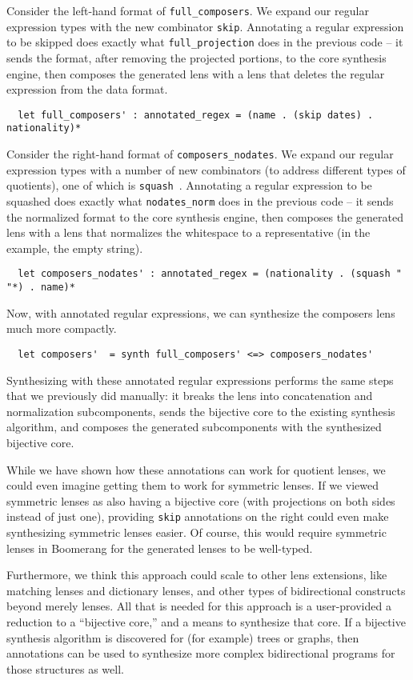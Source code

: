 \documentclass[a4paper]{article}
\begin{document}
Consider the left-hand format of \lstinline{full_composers}. We expand our
regular expression types with the new combinator \lstinline{skip}. Annotating a
regular expression to be skipped does exactly what \lstinline{full_projection}
does in the previous code -- it sends the format, after removing the projected
portions, to the core synthesis engine, then composes the generated lens with a
lens that deletes the regular expression from the data format.
%
\begin{lstlisting}
  let full_composers' : annotated_regex = (name . (skip dates) . nationality)*
\end{lstlisting}
%

Consider the right-hand format of \lstinline{composers_nodates}. We expand our
regular expression types with a number of new combinators (to address different
types of quotients), one of which is
\lstinline{squash}~\cite{maina+:quotient-synthesis}. Annotating a regular
expression to be squashed does exactly what \lstinline{nodates_norm} does in the
previous code -- it sends the normalized format to the core synthesis engine,
then composes the generated lens with a lens that normalizes the whitespace to a
representative (in the example, the empty string).
%
\begin{lstlisting}
  let composers_nodates' : annotated_regex = (nationality . (squash " "*) . name)*
\end{lstlisting}
%

Now, with annotated regular expressions, we can synthesize the composers lens much
more compactly.
%
\begin{lstlisting}
  let composers'  = synth full_composers' <=> composers_nodates'
\end{lstlisting}
%
Synthesizing with these annotated regular expressions performs the same steps
that we previously did manually: it breaks the lens into concatenation and
normalization subcomponents, sends the bijective core to the existing synthesis
algorithm, and composes the generated subcomponents with the synthesized
bijective core.

While we have shown how these annotations can work for quotient lenses, we could
even imagine getting them to work for symmetric lenses. If we viewed symmetric
lenses as also having a bijective core (with projections on both sides instead
of just one), providing \lstinline{skip} annotations on the right could even
make synthesizing symmetric lenses easier. Of course, this would require
symmetric lenses in Boomerang for the generated lenses to be well-typed.

Furthermore, we think this approach could scale to other lens extensions, like
matching lenses and dictionary lenses, and other types of bidirectional
constructs beyond merely lenses. All that is needed for this approach is a
user-provided a reduction to a ``bijective core,'' and a means to synthesize
that core. If a bijective synthesis algorithm is discovered for
(for example) trees or graphs, then annotations can be used to synthesize more
complex bidirectional programs for those structures as well.

 

\end{document}
